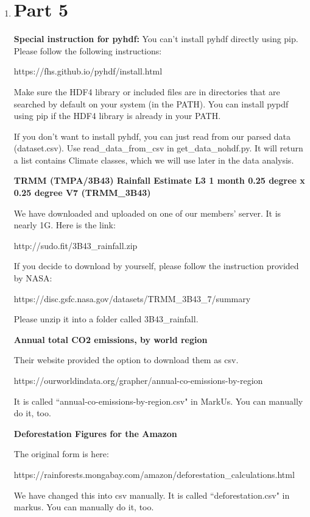 \documentclass[12pt]{article}
\begin{document}
\begin{enumerate}
\newpage

\item \section*{Part 5}

\begin{text}

\textbf{Special instruction for pyhdf:}
You can't install pyhdf directly using pip. Please follow the following instructions:

https://fhs.github.io/pyhdf/install.html

Make sure the HDF4 library or included files are in directories that are searched by default on your system (in the PATH). You can install pypdf using pip if the HDF4 library is already in your PATH.

If you don't want to install pyhdf, you can just read from our parsed data (dataset.csv). Use read\_data\_from\_csv in get\_data\_nohdf.py. It will return a list contains Climate classes, which we will use later in the data analysis.

\textbf{TRMM (TMPA/3B43) Rainfall Estimate L3 1 month 0.25 degree x 0.25 degree V7 (TRMM\_3B43)}

We have downloaded and uploaded on one of our members' server. It is nearly 1G. Here is the link:

http://sudo.fit/3B43\_rainfall.zip

If you decide to download by yourself, please follow the instruction provided by NASA:

https://disc.gsfc.nasa.gov/datasets/TRMM\_3B43\_7/summary

Please unzip it into a folder called 3B43\_rainfall.

\textbf{Annual total CO2 emissions, by world region}

Their website provided the option to download them as csv.

https://ourworldindata.org/grapher/annual-co-emissions-by-region

It is called ``annual-co-emissions-by-region.csv" in MarkUs.
You can manually do it, too.

\textbf{Deforestation Figures for the Amazon}

The original form is here:

https://rainforests.mongabay.com/amazon/deforestation\_calculations.html

We have changed this into csv manually. It is called ``deforestation.csv" in markus.
You can manually do it, too.


\end{text}
\end{enumerate}
\end{document}
